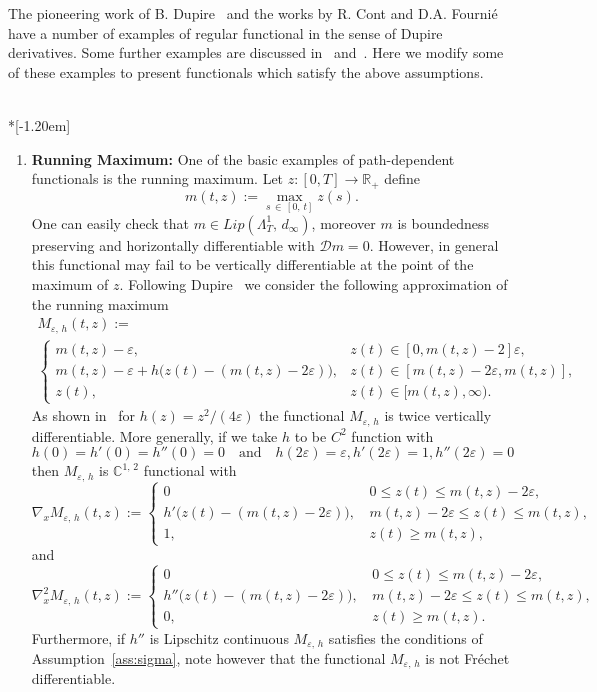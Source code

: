 \documentclass[AHL,Unicode,longabstracts,published]{cedram}
\newcommand{\epsi}{\varepsilon}
\newcommand{\bbC}{\mathbb{C}}
\newcommand{\calD}{\mathcal{D}}
\newcommand{\Rr}{{\mathbb{R}}}
\begin{document}
The pioneering work of B. Dupire~\cite{D09} and the works by R. Cont and D.A. Fournié~\cite{CF10B,CF09,ContFournie2013} have a number of examples of regular functional in the sense of Dupire derivatives. Some further examples are discussed in~\cite{ContKalinin} and~\cite{Kalinin}. Here we modify some of these examples to present functionals which satisfy the above assumptions.

\vspace{10pt}
\pagebreak
\begin{exam}\ \\*[-1.20em]
\begin{enumerate}
\item {\bf{Running Maximum}:} One of the basic examples of path-dependent functionals is the running maximum. Let $z\colon[0,T]\to \Rr_+$ define
\[
m(t, z):=\max_{s\,\in\,[0,\,t]}z(s).
\]
One can easily check that $m\in Lip(\Lambda^{1}_T,\,d_{\infty})$, moreover $m$ is boundedness preserving and horizontally differentiable with $\calD m=0.$ However, in general this functional may fail to be vertically differentiable at the point of the maximum of $z$. Following Dupire~\cite{D09} we consider the following approximation of the running maximum
\begin{multline*}
M_{\epsi,\,h}(t, z):=\\
\begin{cases}
m(t, z)-\epsi, &z(t)\in [0, m(t, z)-2]\epsi,\\
m(t, z)-\epsi+h\big(z(t)-(m(t, z)-2\epsi)\big), & z(t)\in [m(t, z)-2\epsi, m(t, z)],\\
z(t), &z(t)\in [m(t, z), \infty).
\end{cases}
\end{multline*}
As shown in~\cite{D09} for $h(z)=z^2/(4\epsi)$ the functional $M_{\epsi,\,h}$ is twice vertically differentiable. More generally, if we take $h$ to be $C^2$ function with
\[
h(0)=h'(0)=h''(0)=0\quad\text{and}\quad h(2\epsi)=\epsi, h'(2\epsi)=1, h''(2\epsi)=0
\]
then $M_{\epsi,\,h}$ is $\bbC^{1,\,2}$ functional with
\[
\nabla_x M_{\epsi,\,h}(t, z):=
\begin{cases}
0\, &0\leq z(t)\leq m(t, z)-2\epsi,\\
h'\big(z(t)-(m(t, z)-2\epsi)\big),\, &m(t, z)-2\epsi\leq z(t)\leq m(t, z),\\
1,\, &z(t)\geq m(t, z),
\end{cases}
\]
and
\[
\nabla^2_x M_{\epsi,\,h}(t, z):=
\begin{cases}
0\, &0\leq z(t)\leq m(t, z)-2\epsi,\\
h''\big(z(t)-(m(t, z)-2\epsi)\big),\, &m(t, z)-2\epsi\leq z(t)\leq m(t, z),\\
0,\, &z(t)\geq m(t, z).
\end{cases}
\]
Furthermore, if $h''$ is Lipschitz continuous $M_{\epsi,\,h}$ satisfies the conditions of Assumption~\ref{ass:sigma}, note however that the functional $M_{\epsi,\,h}$ is not Fréchet differentiable.


\end{enumerate}
\end{exam}
\end{document}
